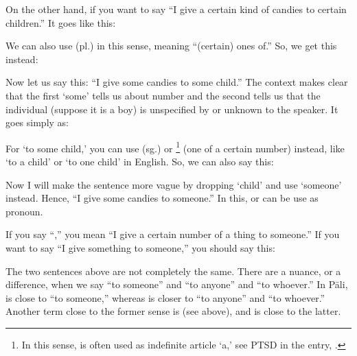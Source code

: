 On the other hand, if you want to say ``I give a certain kind of candies to certain children.'' It goes like this:


We can also use  (pl.)\label{par:ekapl} in this sense, meaning ``(certain) ones of.'' So, we get this instead:


Now let us say this: ``I give some candies to some child.'' The context makes clear that the first `some' tells us about number and the second tells us that the individual (suppose it is a boy) is unspecified by or unknown to the speaker. It goes simply as:


For `to some child,' you can use  (sg.) or \footnote{In this sense,  is often used as indefinite article `a,' see PTSD in the entry, \citealp[see also][p.~46]{cone:dict1}.} (one of a certain number) instead, like `to a child' or `to one child' in English. So, we can also say this:


Now I will make the sentence more vague by dropping `child' and use `someone' instead. Hence, ``I give some candies to someone.'' In this,  or  can be use as pronoun.


If you say ``,'' you mean ``I give a certain number of a thing to someone.'' If you want to say ``I give something to someone,'' you should say this:


The two sentences above are not completely the same. There are a nuance, or a difference, when we say ``to someone'' and ``to anyone'' and ``to whoever.'' In P\=ali,  is close to ``to someone,'' whereas  is closer to ``to anyone'' and ``to whoever.'' Another term close to the former sense is  (see above), and  is close to the latter.

